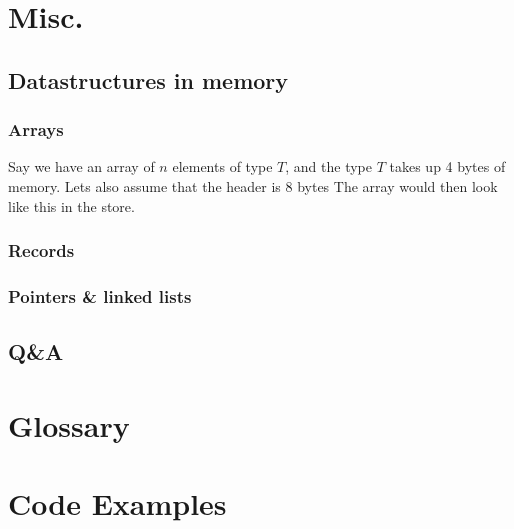 \documentclass[tikz, border=5mm]{article}
\begin{document}
    \section{Misc.}
        \subsection{Datastructures in memory}
        \subsubsection{Arrays}
            Say we have an array of $n$ elements of type $T$, and the type $T$ takes up 4 bytes of memory. Lets also assume that the header is 8 bytes
            The array would then look like this in the store.
            
        \subsubsection{Records}
        \subsubsection{Pointers \& linked lists}
        \subsection{Q\&A}

    \appendix
    \section{Glossary}
    \printnoidxglossaries

    \section{Code Examples}
\end{document}
